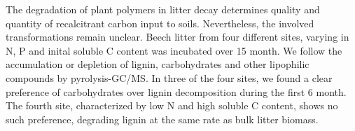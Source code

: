 The degradation of plant polymers in litter decay determines quality and quantity of recalcitrant carbon input to soils. Nevertheless, the involved transformations remain unclear. Beech litter from four different sites, varying in N, P and inital soluble C content was incubated over 15 month. We follow the accumulation or depletion of lignin, carbohydrates and other lipophilic compounds by pyrolysis-GC/MS. 
In three of the four sites, we found a clear preference of carbohydrates over lignin decomposition during the first 6 month. The fourth site, characterized by low N and high soluble C content, shows no such preference, degrading lignin at the same rate as bulk litter biomass.
